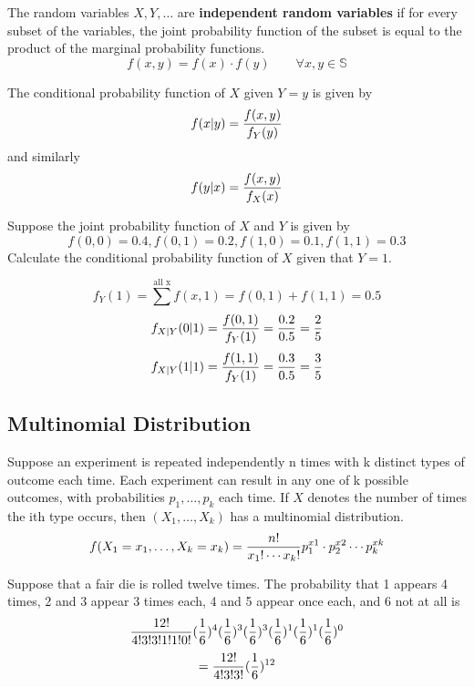 \documentclass[english, 12pt]{article}
\begin{document}
\begin{defn}
The random variables $X,Y,\dots$ are \textbf{independent random variables} if for every subset of the variables, the joint probability function of the subset is equal to the product of the marginal probability functions.
\[f(x,y) = f(x) \cdot f(y)\qquad \forall x,y \in \mathbb{S}\]
\end{defn}

\begin{defn}
The conditional probability function of $X$ given $Y = y$ is given by
\[f(x|y) = \frac{f(x,y)}{f_Y(y)}\]
and similarly
\[f(y|x) = \frac{f(x,y)}{f_X(x)}\]
\end{defn}

\begin{exmp}
Suppose the joint probability function of $X$ and $Y$ is given by
\[f(0,0) = 0.4, f(0,1) = 0.2, f(1,0) = 0.1, f(1,1) = 0.3\]
Calculate the conditional probability function of $X$ given that $Y = 1$.

\begin{sol}
\[f_Y(1) = \sum^{\text{all x}} f(x,1) = f(0,1) + f(1,1) = 0.5\]
\[f_{X|Y}(0 | 1) = \frac{f(0,1)}{f_Y(1)} = \frac{0.2}{0.5} = \frac{2}{5}\]
\[f_{X|Y}(1|1) = \frac{f(1,1)}{f_Y(1)} = \frac{0.3}{0.5} = \frac{3}{5}\]
\end{sol}
\end{exmp}

\subsection{Multinomial Distribution}

Suppose an experiment is repeated independently n times with k distinct types of outcome each time. Each experiment can result in any one of k possible outcomes, with probabilities $p_1,\dots,p_k$ each time. If $X$ denotes the number of times the ith type occurs, then $(X_1,\dots,X_k)$ has a multinomial distribution.
\[f(X_1 = x_1,\dots,X_k = x_k) = \frac{n!}{x_1 !\cdots x_k !} p_{1}^{x1} \cdot p_{2}^{x2} \cdots p_{k}^{xk}\]

\begin{exmp}
Suppose that a fair die is rolled twelve times. The probability that 1 appears 4 times, 2 and 3 appear 3 times each, 4 and 5 appear once each, and 6 not at all is
\[\frac{12!}{4!3!3!1!1!0!} (\frac{1}{6})^4 (\frac{1}{6})^3 (\frac{1}{6})^3 (\frac{1}{6})^1 (\frac{1}{6})^1 (\frac{1}{6})^0\]
\[= \frac{12!}{4!3!3!} (\frac{1}{6})^{12}\]
\end{exmp}
\end{document}
